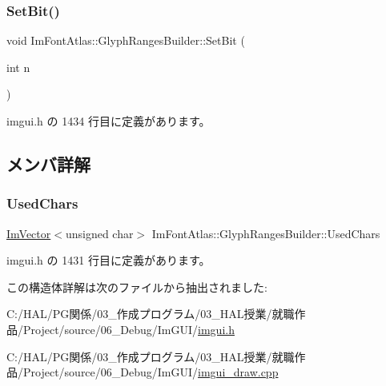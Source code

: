 \subsubsection{\texorpdfstring{Set\+Bit()}{SetBit()}}
{\footnotesize\ttfamily void Im\+Font\+Atlas\+::\+Glyph\+Ranges\+Builder\+::\+Set\+Bit (\begin{DoxyParamCaption}\item[{int}]{n }\end{DoxyParamCaption})\hspace{0.3cm}{\ttfamily [inline]}}



 imgui.\+h の 1434 行目に定義があります。



\subsection{メンバ詳解}
\mbox{\label{struct_im_font_atlas_1_1_glyph_ranges_builder_a369924c3fbeeac0402a6c02d62dd4a71}} 
\subsubsection{\texorpdfstring{Used\+Chars}{UsedChars}}
{\footnotesize\ttfamily \mbox{\hyperlink{class_im_vector}{Im\+Vector}}$<$unsigned char$>$ Im\+Font\+Atlas\+::\+Glyph\+Ranges\+Builder\+::\+Used\+Chars}



 imgui.\+h の 1431 行目に定義があります。



この構造体詳解は次のファイルから抽出されました\+:\begin{DoxyCompactItemize}
\item 
C\+:/\+H\+A\+L/\+P\+G関係/03\+\_\+作成プログラム/03\+\_\+\+H\+A\+L授業/就職作品/\+Project/source/06\+\_\+\+Debug/\+Im\+G\+U\+I/\mbox{\hyperlink{imgui_8h}{imgui.\+h}}\item 
C\+:/\+H\+A\+L/\+P\+G関係/03\+\_\+作成プログラム/03\+\_\+\+H\+A\+L授業/就職作品/\+Project/source/06\+\_\+\+Debug/\+Im\+G\+U\+I/\mbox{\hyperlink{imgui__draw_8cpp}{imgui\+\_\+draw.\+cpp}}\end{DoxyCompactItemize}
